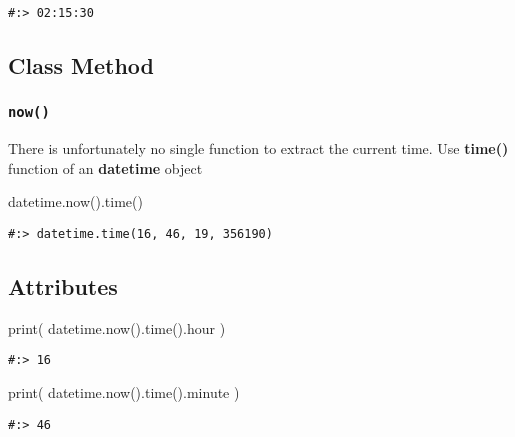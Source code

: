 \documentclass[
]{book}
\newenvironment{Shaded}{\begin{snugshade}}{\end{snugshade}}
\newcommand{\BuiltInTok}[1]{#1}
\newcommand{\NormalTok}[1]{#1}
\begin{document}
\begin{verbatim}
#:> 02:15:30
\end{verbatim}

\hypertarget{class-method-2}{%
\subsection{Class Method}\label{class-method-2}}

\hypertarget{now}{%
\subsubsection{\texorpdfstring{\texttt{now()}}{now()}}\label{now}}

There is unfortunately no single function to extract the current time. Use \textbf{time()} function of an \textbf{datetime} object

\begin{Shaded}
\begin{Highlighting}[]
\NormalTok{datetime.now().time()}
\end{Highlighting}
\end{Shaded}

\begin{verbatim}
#:> datetime.time(16, 46, 19, 356190)
\end{verbatim}

\hypertarget{attributes-2}{%
\subsection{Attributes}\label{attributes-2}}

\begin{Shaded}
\begin{Highlighting}[]
\BuiltInTok{print}\NormalTok{( datetime.now().time().hour )}
\end{Highlighting}
\end{Shaded}

\begin{verbatim}
#:> 16
\end{verbatim}

\begin{Shaded}
\begin{Highlighting}[]
\BuiltInTok{print}\NormalTok{( datetime.now().time().minute )}
\end{Highlighting}
\end{Shaded}

\begin{verbatim}
#:> 46
\end{verbatim}
\end{document}
